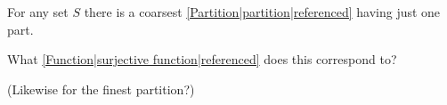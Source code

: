 

For any set $S$ there is a coarsest \ref{Partition|partition|referenced} having just one part.

What \ref{Function|surjective function|referenced} does this correspond to?

(Likewise for the finest partition?)